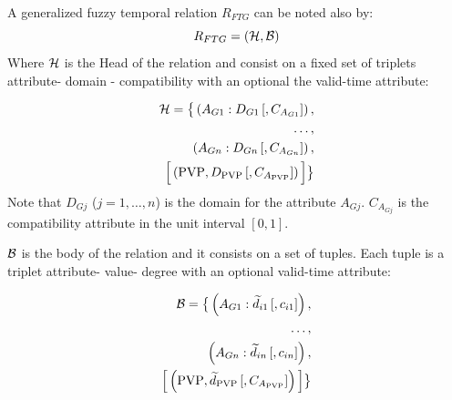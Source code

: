 \begin{definition}
% 
% 
% 
% 
 A generalized fuzzy temporal relation $R_{FTG}$ can be noted also by:
\label{def:generalized-fuzzy-temporal-relation}
\begin{equation}
\label{eq:generalized-fuzzy-temporal-relation}
R_{FTG} = \left(\mathcal{H}, \mathcal{B} \right)
\end{equation}
Where $\mathcal{H}$ is the Head of the relation and consist on a fixed set of triplets attribute- domain - compatibility with an optional the valid-time attribute:

\begin{align}
\label{eq:head-valid-time}
\mathcal{H} = \big \lbrace \left(A_{G1}:D_{G1}\left[,C_{A_{G1}} \right] \right),\\
\nonumber
 \ldots,\\
 \nonumber
  \left(A_{Gn}:D_{Gn}\left[,C_{A_{Gn}} \right] \right),\\
  \nonumber
  \Big[  \left( \text{PVP}, D_{\text{PVP}}\left[,C_{A_{\text{PVP}}} \right] \right) \Big] \big \rbrace
\end{align}
Note that $D_{Gj}$ ($j = 1, \ldots, n$) is the domain for the attribute $A_{Gj}$. $C_{A_{Gj}}$ is the compatibility attribute in the unit interval $\left[0, 1 \right]$.

$\mathcal{B}$ is the body of the relation and it consists on a set of tuples. Each tuple is a triplet attribute- value- degree with an optional valid-time attribute:

\begin{align}
\label{eq:body-valid-time}
\mathcal{B} = \big \lbrace \left(A_{G1}:\widetilde{d}_{i1}\left[,c_{i1} \right] \right),\\
\nonumber
 \ldots,\\
 \nonumber
  \left(A_{Gn}:\widetilde{d}_{in}\left[,c_{in} \right] \right),\\
  \nonumber
   \Big[  \left( \text{PVP}, \widetilde{d}_{\text{PVP}} \left[,C_{A_{\text{PVP}}} \right] \right)  \Big] \big \rbrace
\end{align}

\end{definition}



